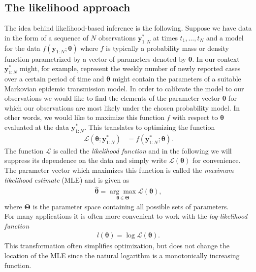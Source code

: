 \subsection{The likelihood approach}
The idea behind likelihood-based inference is the following. Suppose we have data in the form of  a sequence of $N$ observations $\bm{y}^*_{1:N}$ at times $t_1,\dots ,t_N$ and a model for the data $f(\bm{y}_{1:N};\bm{\theta})$ where $f$ is typically a probability mass or density function parametrized by  a vector of parameters denoted by $\bm{\theta}$. In our context $\bm{y}^*_{1:N}$ might, for example, represent the weekly number of newly reported cases over a certain period of time  and $\bm{\theta}$ might contain the  parameters of a suitable Markovian epidemic  transmission model. In order to calibrate the model to our observations we would like to find the elements of the  parameter vector $\bm{\theta}$ for which our observations are most likely under the chosen probability model. In other words, we would like to maximize this function  $f$ with respect to $\bm{\theta}$ evaluated at the data  $\bm{y}^*_{1:N}$. This translates to optimizing the function
\begin{align*}
\mathcal{L}(\bm{\theta};\bm{y}^*_{1:N})&=f(\bm{y}^*_{1:N};\bm{\theta}).
\end{align*} 
The function $\mathcal{L}$ is called the \textit{likelihood function} and in the following we will  suppress its dependence on the data and simply write $\mathcal{L}(\bm{\theta})$ for convenience. The parameter vector which maximizes this function  is called the \textit{maximum likelihood estimate} (MLE) and is given as 
\begin{align}
\hat{\bm{\theta}} =\underset{\bm{\theta}\in \bm{\Theta}}{\arg\max} \mathcal{L}(\bm{\theta}),
\label{mle}
\end{align}
where $\bm{\Theta}$ is the parameter space containing all possible sets of parameters. \\
For many applications it is often more convenient to work with the \textit{log-likelihood function} 
\begin{align*}
l(\bm{\theta})=\log \mathcal{L}(\bm{\theta}).
\end{align*} 
This transformation often simplifies optimization, but does not change the location of the MLE since the natural logarithm is a monotonically increasing function.
